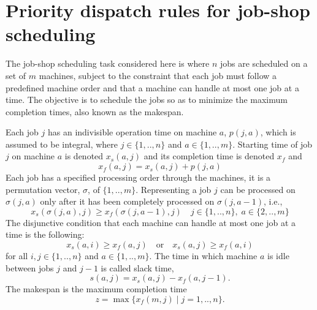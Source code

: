 \documentclass[10pt]{llncs}
\begin{document}
\section{Priority dispatch rules for job-shop scheduling}\label{sec:JSSP}

The job-shop scheduling task considered here is where $n$ jobs are scheduled on a set of $m$ machines, subject to the constraint that each job must follow a predefined machine order and that a machine can handle at most one job at a time.
The objective is to schedule the jobs so as to minimize the maximum completion times, also known as the makespan. 

Each job $j$ has an indivisible operation time on machine $a$, $p(j,a)$, which is assumed to be integral, where $j \in\{1,..,n\}$ and $a\in\{ 1,..,m\}$. Starting time of job $j$ on machine $a$ is denoted $x_s(a,j)$ and its completion time is denoted $x_f$ and
\begin{equation}  x_f(a,j)=x_s(a,j)+p(j,a) \end{equation}
Each job has a specified processing order through the machines, it is a permutation vector, $\sigma$, of $\{1,..,m\}$. Representing a job $j$ can be processed on $\sigma(j,a)$ only after it has been completely processed on $\sigma(j,a-1)$, i.e.,
\begin{equation}\label{eq:Permutation}
   x_s( \sigma(j,a),j) \geq x_f(\sigma(j,a-1),j) \quad j\in\{1,..,n\},\; a\in\{2,..,m\}
\end{equation}
The disjunctive condition that each machine can handle at most one job at a time is the following: 
\begin{equation}\label{eq:OneJobPerMac}
   x_s(a,i) \geq x_f(a,j) \quad\textrm{or}\quad x_s(a,j) \geq x_f(a,i)  
\end{equation}
for all $i,j\in\{1,..,n\}$ and $a\in\{1,..,m\}$.  The time in which machine $a$ is idle between jobs $j$ and $j-1$ is called slack time, 
\begin{equation} s(a,j)=x_s(a,j)-x_f(a,j-1). \end{equation}
The makespan is the maximum completion time  
\begin{equation}
  z = \max\{x_f(m,j)\;|\;j=1,..,n\}.
\end{equation}
\end{document}

